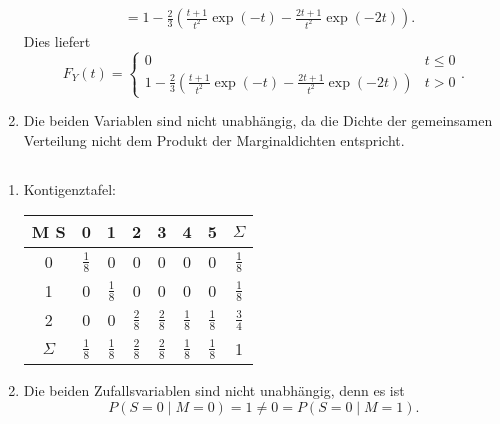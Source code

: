 \documentclass[a4paper]{article}
\begin{document}
\begin{enumerate}
\begin{align*}
        &= 1 - \frac{2}{3} \left( \frac{t+1}{t^2} \exp(-t) - \frac{2t + 1}{t^2} \exp(-2t) \right)\text{.}
    \end{align*}
    Dies liefert
    \begin{equation*}
        F_Y(t) = \left\{ \begin{matrix}
            0 & t \leq 0 \\ 
            1 - \frac{2}{3} \left( \frac{t+1}{t^2} \exp(-t) - \frac{2t + 1}{t^2} \exp(-2t)   \right) & t > 0
        \end{matrix} \right. \text{.}
    \end{equation*}
    \item Die beiden Variablen sind nicht unabhängig, da die Dichte der gemeinsamen Verteilung nicht dem Produkt der Marginaldichten entspricht.
\end{enumerate}

\subsection{}
\begin{enumerate}
    \item Kontigenztafel:
    \begin{center}
        \begin{tabular}{|c|c|c|c|c|c|c|c|}
            \hline
            M  S & 0 & 1 & 2 & 3 & 4 & 5 & $\Sigma$ \\ \hline
            0 & $\frac{1}{8}$ & 0 & 0 & 0 & 0 & 0 & $\frac{1}{8}$ \\ \hline
            1 & 0 & $\frac{1}{8}$ & 0 & 0 & 0 & 0 & $\frac{1}{8}$ \\ \hline
            2 & 0 & 0 & $\frac{2}{8}$ & $\frac{2}{8}$ & $\frac{1}{8}$ & $\frac{1}{8}$ & $\frac{3}{4}$\\ \hline
            $\Sigma$ & $\frac{1}{8}$ & $\frac{1}{8}$ & $\frac{2}{8}$ & $\frac{2}{8}$ & $\frac{1}{8}$ & $\frac{1}{8}$ &  1 \\ \hline
        \end{tabular}
    \end{center}
    \item Die beiden Zufallsvariablen sind nicht unabhängig, denn es ist 
    \begin{equation*}
        P(S = 0 \mid M = 0) = 1 \neq 0 = P(S = 0 \mid M = 1) \text{.}
    \end{equation*}
\end{enumerate}
\end{document}
